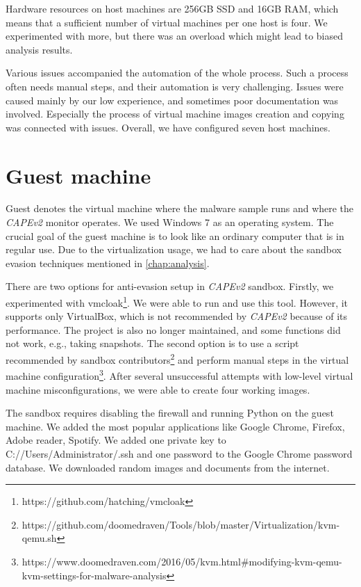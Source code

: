 Hardware resources on host machines are 256GB SSD and 16GB RAM, which means that a sufficient number of virtual machines per one host is four. We experimented with more, but there was an overload which might lead to biased analysis results.

Various issues accompanied the automation of the whole process. Such a process often needs manual steps, and their automation is very challenging. Issues were caused mainly by our low experience, and sometimes poor documentation was involved. Especially the process of virtual machine images creation and copying was connected with issues. Overall, we have configured seven host machines.

\section{Guest machine}
Guest denotes the virtual machine where the malware sample runs and where the \emph{CAPEv2} monitor operates. We used Windows 7 as an operating system. The crucial goal of the guest machine is to look like an ordinary computer that is in regular use. Due to the virtualization usage, we had to care about the sandbox evasion techniques mentioned in \ref{chap:analysis}.

There are two options for anti-evasion setup in \emph{CAPEv2} sandbox. Firstly, we experimented with vmcloak\footnote{https://github.com/hatching/vmcloak}. We were able to run and use this tool. However, it supports only VirtualBox, which is not recommended by \emph{CAPEv2} because of its performance. The project is also no longer maintained, and some functions did not work, e.g., taking snapshots. The second option is to use a script recommended by sandbox contributors\footnote{https://github.com/doomedraven/Tools/blob/master/Virtualization/kvm-qemu.sh} and perform manual steps in the virtual machine configuration\footnote{https://www.doomedraven.com/2016/05/kvm.html\#modifying-kvm-qemu-kvm-settings-for-malware-analysis}. After several unsuccessful attempts with low-level virtual machine misconfigurations, we were able to create four working images.

The sandbox requires disabling the firewall and running Python on the guest machine. We added the most popular applications like Google Chrome, Firefox, Adobe reader, Spotify. We added one private key to C://Users/Administrator/.ssh and one password to the Google Chrome password database. We downloaded random images and documents from the internet.

